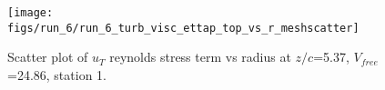 \begin{figure}[H]
\centering
\texttt{[image: figs/run\_6/run\_6\_turb\_visc\_ettap\_top\_vs\_r\_meshscatter]}
\caption{Scatter plot of $
u_T$ reynolds stress term vs radius at $z/c$=5.37, $V_{free}$=24.86, station 1.}
\label{fig:run_6_turb_visc_ettap_top_vs_r_meshscatter}
\end{figure}


